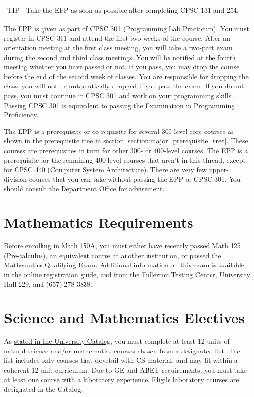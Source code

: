 \documentclass{book}
\newenvironment{tip}
               {\tcolorbox \begin{tabular}{m{.5in} m{5in}} \Large{TIP} & }
               {\end{tabular} \endtcolorbox}
\begin{document}
\begin{tip}
  Take the EPP as soon as possible after completing CPSC 131 and 254.
  \end{tip}

The EPP is given as part of CPSC 301 (Programming Lab Practicum). You must register in CPSC 301 and attend the first two weeks of the course. After an orientation meeting at the first class meeting, you will take a two-part exam during the second and third class meetings. You will be notified at the fourth meeting whether you have passed or not. If you pass, you may drop the course before the end of the second week of classes. You are responsible for dropping the class; you will not be automatically dropped if you pass the exam. If you do not pass, you must continue in CPSC 301 and work on your programming skills. Passing CPSC 301 is equivalent to passing the Examination in Programming Proficiency.

The EPP is a prerequisite or co-requisite for several 300-level core courses as shown in the prerequisite tree in section \ref{section:major_prerequisite_tree}. These courses are prerequisites in turn for other 300- or 400-level courses. The EPP is a prerequisite for the remaining 400-level courses that aren’t in this thread, except for CPSC 440 (Computer System Architecture). There are very few upper-division courses that you can take without passing the EPP or CPSC 301. You should consult the Department Office for advisement.

\section{Mathematics Requirements}

Before enrolling in Math 150A, you must either have recently passed Math 125 (Pre-calculus), an equivalent course at another institution, or passed the Mathematics Qualifying Exam. Additional information on this exam is available in the online registration guide, and from the Fullerton Testing Center, University Hall 229, and (657) 278-3838.

\section{Science and Mathematics Electives}

As \href{http://catalog.fullerton.edu/preview_program.php?catoid=2&poid=537&returnto=137}{stated in the University Catalog}, you must complete at least 12 units of natural science and/or mathematics courses chosen from a designated list. The list includes only courses that dovetail with CS material, and may fit within a coherent 12-unit curriculum. Due to GE and ABET requirements, you must take at least one course with a laboratory experience. Eligile laboratory courses are designated in the Catalog.
\end{document}
